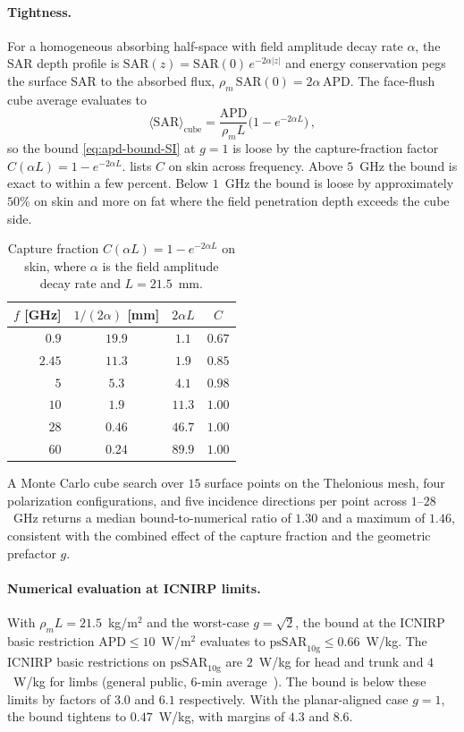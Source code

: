 \documentclass[journal,twocolumn,10pt]{IEEEtran}
\theoremstyle{plain}
\theoremstyle{remark}
\newcommand{\APD}{\mathrm{APD}}
\begin{document}
\paragraph{Tightness.}
For a homogeneous absorbing half-space with field amplitude decay
rate $\alpha$, the SAR depth profile is
$\mathrm{SAR}(z) = \mathrm{SAR}(0)\,e^{-2\alpha|z|}$ and energy
conservation pegs the surface SAR to the absorbed flux,
$\rho_m\,\mathrm{SAR}(0) = 2\alpha\,\APD$. The face-flush cube average
evaluates to
\begin{equation}\label{eq:cube-tightness-SI}
  \langle\mathrm{SAR}\rangle_{\mathrm{cube}}
  = \frac{\APD}{\rho_m L}\bigl(1 - e^{-2\alpha L}\bigr)\, ,
\end{equation}
so the bound \eqref{eq:apd-bound-SI} at $g = 1$ is loose by the
capture-fraction factor $C(\alpha L) = 1 - e^{-2\alpha L}$.
 lists $C$ on skin across frequency. Above
$5$~GHz the bound is exact to within a few percent. Below $1$~GHz the
bound is loose by approximately $50\%$ on skin and more on fat where
the field penetration depth exceeds the cube side.

\begin{table}[h]
\centering
\caption{Capture fraction $C(\alpha L) = 1 - e^{-2\alpha L}$ on skin,
where $\alpha$ is the field amplitude decay rate and
$L = 21.5$~mm.}\label{tab:capture-SI}
\small
\begin{tabular}{rccc}
\toprule
$f$ [GHz] & $1/(2\alpha)$ [mm] & $2\alpha L$ & $C$ \\
\midrule
$0.9$  & $19.9$ & $1.1$  & $0.67$ \\
$2.45$ & $11.3$ & $1.9$  & $0.85$ \\
$5$    & $ 5.3$ & $4.1$  & $0.98$ \\
$10$   & $ 1.9$ & $11.3$ & $1.00$ \\
$28$   & $0.46$ & $46.7$ & $1.00$ \\
$60$   & $0.24$ & $89.9$ & $1.00$ \\
\bottomrule
\end{tabular}
\end{table}

A Monte Carlo cube search over $15$ surface points on the Thelonious
mesh, four polarization configurations, and five incidence directions
per point across $1$--$28$~GHz returns a median bound-to-numerical
ratio of $1.30$ and a maximum of $1.46$, consistent with the
combined effect of the capture fraction and the geometric prefactor
$g$.

\paragraph{Numerical evaluation at ICNIRP limits.}
With $\rho_m L = 21.5$~kg/m$^2$ and the worst-case $g = \sqrt{2}$,
the bound at the ICNIRP basic restriction $\APD \le 10$~W/m$^2$
evaluates to $\mathrm{psSAR}_{10\mathrm{g}} \le 0.66$~W/kg. The
ICNIRP basic restrictions on $\mathrm{psSAR}_{10\mathrm{g}}$ are
$2$~W/kg for head and trunk and $4$~W/kg for limbs (general public,
$6$-min average~\cite{ICNIRP2020}). The bound is below these limits
by factors of $3.0$ and $6.1$ respectively. With the planar-aligned
case $g = 1$, the bound tightens to $0.47$~W/kg, with margins of
$4.3$ and $8.6$.
\end{document}
